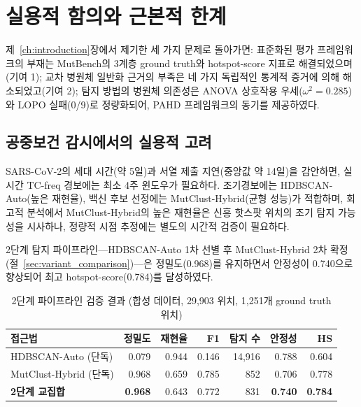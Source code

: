 \section{실용적 함의와 근본적 한계}

제~\ref{ch:introduction}장에서 제기한 세 가지 문제로 돌아가면: 표준화된 평가 프레임워크의 부재는 MutBench의 3계층 ground truth와 hotspot-score 지표로 해결되었으며(기여 1); 교차 병원체 일반화 근거의 부족은 네 가지 독립적인 통계적 증거에 의해 해소되었고(기여 2); 탐지 방법의 병원체 의존성은 ANOVA 상호작용 우세($\omega^2 = 0.285$)와 LOPO 실패(0/9)로 정량화되어, PAHD 프레임워크의 동기를 제공하였다.

\subsection{공중보건 감시에서의 실용적 고려}
\label{sec:practical_surveillance}

SARS-CoV-2의 세대 시간(약 5일)과 서열 제출 지연(중앙값 약 14일)을 감안하면, 실시간 TC-freq 경보에는 최소 4주 윈도우가 필요하다.
조기경보에는 HDBSCAN-Auto(높은 재현율), 백신 후보 선정에는 MutClust-Hybrid(균형 성능)가 적합하며, 회고적 분석에서 MutClust-Hybrid의 높은 재현율은 신흥 핫스팟 위치의 조기 탐지 가능성을 시사하나, 정량적 시점 추정에는 별도의 시간적 검증이 필요하다.

2단계 탐지 파이프라인---HDBSCAN-Auto 1차 선별 후 MutClust-Hybrid 2차 확정(절~\ref{sec:variant_comparison})---은 정밀도(0.968)를 유지하면서 안정성이 0.740으로 향상되어 최고 hotspot-score(0.784)를 달성하였다.

\begin{table}[htbp]
\centering
\caption{2단계 파이프라인 검증 결과 (합성 데이터, 29,903 위치, 1,251개 ground truth 위치)}
\label{tab:twostep_pipeline}
\small
\begin{tabular}{lrrrrrr}
\toprule
\textbf{접근법} & \textbf{정밀도} & \textbf{재현율} & \textbf{F1} & \textbf{탐지 수} & \textbf{안정성} & \textbf{HS} \\
\midrule
HDBSCAN-Auto (단독) & 0.079 & 0.944 & 0.146 & 14,916 & 0.788 & 0.604 \\
MutClust-Hybrid (단독) & 0.968 & 0.659 & 0.785 & 852 & 0.706 & 0.778 \\
\midrule
\textbf{2단계 교집합} & \textbf{0.968} & 0.643 & 0.772 & 831 & \textbf{0.740} & \textbf{0.784} \\
\bottomrule
\end{tabular}
\end{table}

